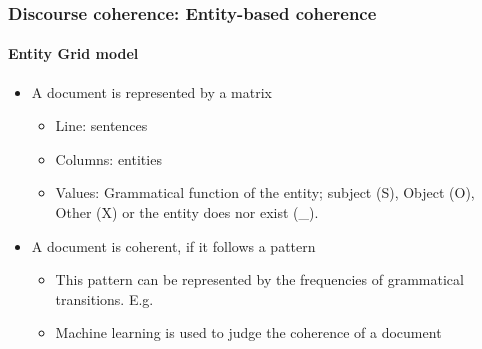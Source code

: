 \documentclass[xcolor=table]{beamer}
\begin{document}
\begin{frame}
	\frametitle{Discourse coherence: Entity-based coherence}
	\framesubtitle{Entity Grid model}
	
	\begin{itemize}
		\item A document is represented by a matrix
		\begin{itemize}
			\item Line: sentences
			\item Columns: entities
			\item Values: Grammatical function of the entity; subject (S), Object (O), Other (X) or the entity does nor exist (\_).
		\end{itemize}
		\item A document is coherent, if it follows a pattern
		\begin{itemize}
			\item This pattern can be represented by the frequencies of grammatical transitions. E.g. 
			\item Machine learning is used to judge the coherence of a document
		\end{itemize}
		
	\end{itemize}
	
\end{frame}
\end{document}
